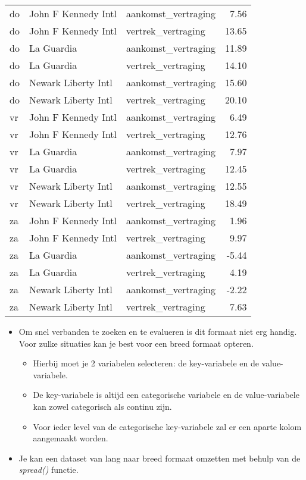 \documentclass[]{memoir}
\providecommand{\tightlist}{%
  \setlength{\itemsep}{0pt}\setlength{\parskip}{0pt}}
\begin{document}
\begin{table}[t]
\begin{tabular}{lllr}
do & John F Kennedy Intl & aankomst\_vertraging & 7.56\\
\addlinespace
do & John F Kennedy Intl & vertrek\_vertraging & 13.65\\
do & La Guardia & aankomst\_vertraging & 11.89\\
do & La Guardia & vertrek\_vertraging & 14.10\\
do & Newark Liberty Intl & aankomst\_vertraging & 15.60\\
do & Newark Liberty Intl & vertrek\_vertraging & 20.10\\
\addlinespace
vr & John F Kennedy Intl & aankomst\_vertraging & 6.49\\
vr & John F Kennedy Intl & vertrek\_vertraging & 12.76\\
vr & La Guardia & aankomst\_vertraging & 7.97\\
vr & La Guardia & vertrek\_vertraging & 12.45\\
vr & Newark Liberty Intl & aankomst\_vertraging & 12.55\\
\addlinespace
vr & Newark Liberty Intl & vertrek\_vertraging & 18.49\\
za & John F Kennedy Intl & aankomst\_vertraging & 1.96\\
za & John F Kennedy Intl & vertrek\_vertraging & 9.97\\
za & La Guardia & aankomst\_vertraging & -5.44\\
za & La Guardia & vertrek\_vertraging & 4.19\\
\addlinespace
za & Newark Liberty Intl & aankomst\_vertraging & -2.22\\
za & Newark Liberty Intl & vertrek\_vertraging & 7.63\\
\bottomrule
\end{tabular}
\end{table}

\begin{itemize}
\tightlist
\item
  Om snel verbanden te zoeken en te evalueren is dit formaat niet erg
  handig. Voor zulke situaties kan je best voor een breed formaat
  opteren.

  \begin{itemize}
  \tightlist
  \item
    Hierbij moet je 2 variabelen selecteren: de key-variabele en de
    value-variabele.
  \item
    De key-variabele is altijd een categorische variabele en de
    value-variabele kan zowel categorisch als continu zijn.
  \item
    Voor ieder level van de categorische key-variabele zal er een aparte
    kolom aangemaakt worden.
  \end{itemize}
\item
  Je kan een dataset van lang naar breed formaat omzetten met behulp van
  de \emph{spread()} functie.
\end{itemize}
\end{document}
